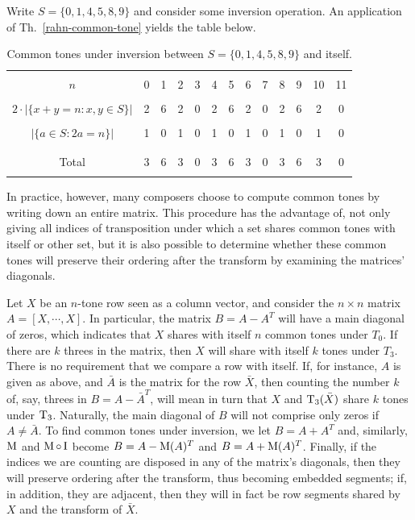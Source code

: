 \begin{example}
    \label{rahn-example}
    \cite[11]{Rahn1975}
    Write $S = \{ 0, 1, 4, 5, 8, 9 \}$ and consider some inversion operation. An application of Th.~\ref{rahn-common-tone} yields the table below.
    \begin{table}[htbp]
    \caption[Rahn's Common Tones Under Inversion]{Common tones under inversion between $S = \{ 0, 1, 4, 5, 8, 9 \}$ and itself.}
    \centering
    \vspace{12pt}
    \begin{tabular}{ c | *{12}{c} }
        \hline\\
        $n$ & 0 & 1 & 2 & 3 & 4 & 5 & 6 & 7 & 8 & 9 & 10 & 11 \\\\
        $2 \cdot |\{x + y = n : x, y \in S\}|$ & 2 & 6 & 2 & 0 & 2 & 6 & 2 & 0 & 2 & 6 & 2 & 0 \\\\
        $|\{a \in S : 2a = n\}|$ & 1 & 0 & 1 & 0 & 1 & 0 & 1 & 0 & 1 & 0 & 1 & 0 \\\\
        \hline\\
        Total & 3 & 6 & 3 & 0 & 3 & 6 & 3 & 0 & 3 & 6 & 3 & 0 \\\\
        \hline
    \end{tabular}
    \end{table}
\end{example}

In practice, however, many composers choose to compute common tones by writing down an entire matrix. This procedure has the advantage of, not only giving all indices of transposition under which a set shares common tones with itself or other set, but it is also possible to determine whether these common tones will preserve their ordering after the transform by examining the matrices' diagonals.

\begin{example}
	\cite[49]{Morris1987}
    \label{morris-common-tones}
    Let $X$ be an $n$-tone row seen as a column vector, and consider the $n \times n$ matrix $A = [X, \cdots, X]$. In particular, the matrix $B = A - A^T$ will have a main diagonal of zeros, which indicates that $X$ shares with itself $n$ common tones under $T_0$. If there are $k$ threes in the matrix, then $X$ will share with itself $k$ tones under $T_3$. There is no requirement that we compare a row with itself. If, for instance, $A$ is given as above, and $\bar{A}$ is the matrix for the row $\bar{X}$, then counting the number $k$ of, say, threes in $B = A - \bar{A}^T$, will mean in turn that $X$ and $\operatorname{T}_3(\bar{X})$ share $k$ tones under $\operatorname{T}_3$. Naturally, the main diagonal of $B$ will not comprise only zeros if $A \ne \bar{A}$. To find common tones under inversion, we let $B = A + A^T$ and, similarly, $\operatorname{M}$ and $\operatorname{M} \circ \operatorname{I}$ become $B = A - \operatorname{M}(A)^T$ and $B = A + \operatorname{M}(A)^T$. Finally, if the indices we are counting are disposed in any of the matrix's diagonals, then they will preserve ordering after the transform, thus becoming embedded segments; if, in addition, they are adjacent, then they will in fact be row segments shared by $X$ and the transform of $\bar{X}$.
\end{example}


